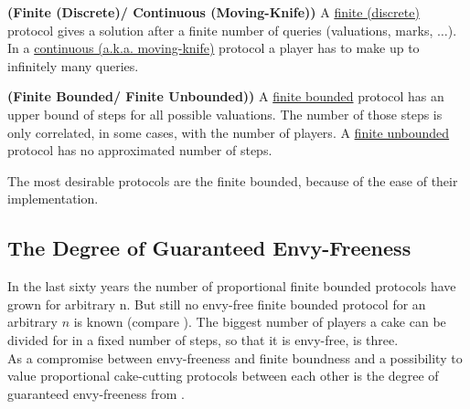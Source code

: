 \begin{defi}{\textbf{(Finite (Discrete)/ Continuous (Moving-Knife))}}
\newline A \underline{finite (discrete)} protocol gives a solution after a finite number of queries (valuations, marks, $\ldots$). In a \underline{continuous (a.k.a. moving-knife)} protocol a player has to make up to infinitely many queries.
\end{defi}
\begin{defi}{\textbf{(Finite Bounded/ Finite Unbounded))}}
\newline A \underline{finite bounded} protocol has an upper bound of steps for all possible valuations. The number of those steps is only correlated, in some cases, with the number of players. A \underline{finite unbounded} protocol has no approximated number of steps.
\end{defi}
The most desirable protocols are the finite bounded, because of the ease of their implementation.

\subsection{The Degree of Guaranteed Envy-Freeness}
In the last sixty years the number of proportional finite bounded protocols have grown for arbitrary n. But still no envy-free finite bounded protocol for an arbitrary $n$ is known (compare \cite{chen:truth}). The biggest number of players a cake can be divided for in a fixed number of steps, so that it is envy-free, is three.\\ As a compromise between envy-freeness and finite boundness and a possibility to value proportional cake-cutting protocols between each other is the degree of guaranteed envy-freeness from \cite{lindner:degrees}. 

